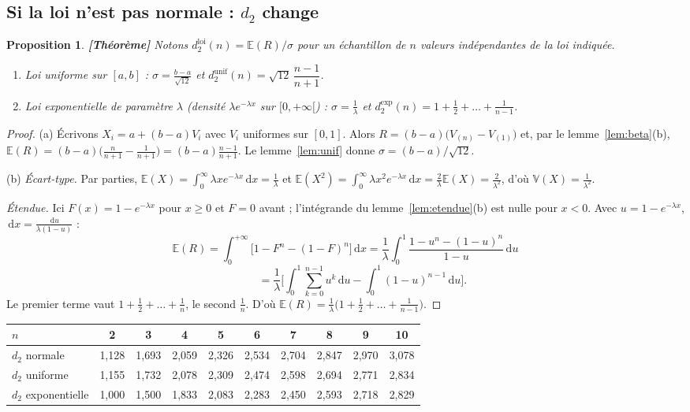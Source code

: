 \documentclass[11pt,a4paper]{article}
\theoremstyle{tq}
\newtheorem{prop}{Proposition}
\theoremstyle{remark}
\newcommand{\thm}{\textcolor{vertTQ}{\textbf{[Théorème]}}}
\newcommand{\E}{\mathbb{E}}
\newcommand{\V}{\mathbb{V}}
\newcommand{\dd}{\,\mathrm{d}}
\begin{document}
\subsection{Si la loi n'est pas normale : $d_2$ change}\label{sec:d2lois}
\begin{prop}\thm{}
Notons $d_2^{\text{loi}}(n)=\E(R)/\sigma$ pour un échantillon de $n$ valeurs indépendantes de la loi indiquée.
\begin{enumerate}[nosep,label=(\alph*)]
\item Loi uniforme sur $[a,b]$ : $\sigma=\frac{b-a}{\sqrt{12}}$ et $d_2^{\text{unif}}(n)=\sqrt{12}\,\dfrac{n-1}{n+1}$.
\item Loi exponentielle de paramètre $\lambda$ (densité $\lambda e^{-\lambda x}$ sur $[0,+\infty[$) : $\sigma=\frac1\lambda$ et $d_2^{\text{exp}}(n)=1+\frac12+\dots+\frac1{n-1}$.
\end{enumerate}
\end{prop}
\begin{proof}
(a) Écrivons $X_i=a+(b-a)V_i$ avec $V_i$ uniformes sur $[0,1]$. Alors $R=(b-a)\big(V_{(n)}-V_{(1)}\big)$ et, par le lemme~\ref{lem:beta}(b), $\E(R)=(b-a)\big(\frac{n}{n+1}-\frac{1}{n+1}\big)=(b-a)\frac{n-1}{n+1}$. Le lemme~\ref{lem:unif} donne $\sigma=(b-a)/\sqrt{12}$.

(b) \emph{Écart-type.} Par parties, $\E(X)=\int_0^\infty\lambda xe^{-\lambda x}\dd x=\frac1\lambda$ et $\E(X^2)=\int_0^\infty\lambda x^2e^{-\lambda x}\dd x=\frac2\lambda\E(X)=\frac{2}{\lambda^2}$, d'où $\V(X)=\frac1{\lambda^2}$.

\emph{Étendue.} Ici $F(x)=1-e^{-\lambda x}$ pour $x\ge0$ et $F=0$ avant ; l'intégrande du lemme~\ref{lem:etendue}(b) est nulle pour $x<0$. Avec $u=1-e^{-\lambda x}$, $\dd x=\frac{\dd u}{\lambda(1-u)}$ :
\[
\E(R)=\int_0^{+\infty}\Big[1-F^n-(1-F)^n\Big]\dd x=\frac1\lambda\int_0^1\frac{1-u^n-(1-u)^n}{1-u}\dd u
\]
\[
\phantom{\E(R)}=\frac1\lambda\Big[\int_0^1\sum_{k=0}^{n-1}u^k\dd u-\int_0^1(1-u)^{n-1}\dd u\Big].
\]
Le premier terme vaut $1+\frac12+\dots+\frac1n$, le second $\frac1n$. D'où $\E(R)=\frac1\lambda\big(1+\frac12+\dots+\frac1{n-1}\big)$.
\end{proof}

\begin{center}\small
\begin{tabular}{@{}lccccccccc@{}}
\toprule
$n$ & 2 & 3 & 4 & 5 & 6 & 7 & 8 & 9 & 10\\
\midrule
$d_2$ normale & 1,128 & 1,693 & 2,059 & 2,326 & 2,534 & 2,704 & 2,847 & 2,970 & 3,078\\
$d_2$ uniforme & 1,155 & 1,732 & 2,078 & 2,309 & 2,474 & 2,598 & 2,694 & 2,771 & 2,834\\
$d_2$ exponentielle & 1,000 & 1,500 & 1,833 & 2,083 & 2,283 & 2,450 & 2,593 & 2,718 & 2,829\\
\bottomrule
\end{tabular}
\end{center}
\end{document}
